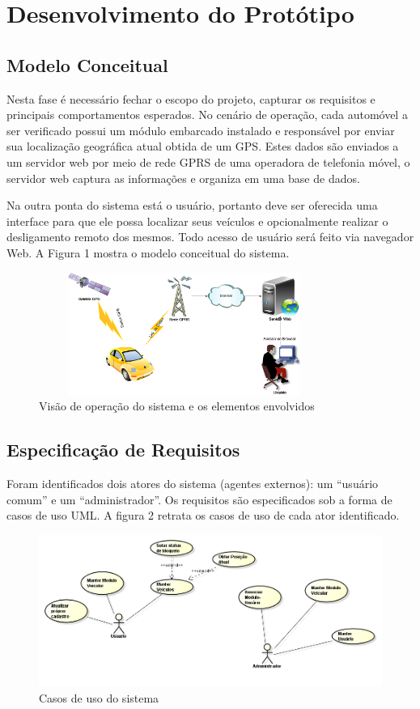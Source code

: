 \chapter{Desenvolvimento do Protótipo}
\label{cap:desenvolvimento do prototipo}

\section{Modelo Conceitual}
Nesta fase é necessário fechar o escopo do projeto, capturar os requisitos e principais comportamentos 
esperados. No cenário de operação, cada automóvel a ser verificado possui um módulo embarcado instalado 
e responsável por enviar sua localização geográfica atual obtida de um GPS. Estes dados são enviados a 
um servidor web por meio de rede GPRS de uma operadora de telefonia móvel, o servidor web captura as 
informações e organiza em uma base de dados. 

Na outra ponta do sistema está o usuário, portanto deve ser oferecida uma interface para que ele possa
localizar seus veículos e opcionalmente realizar o desligamento remoto dos mesmos. Todo acesso de usuário 
será feito via navegador Web. A Figura 1 mostra o modelo conceitual do sistema.

\begin{figure}[!htb]
\centering
\includegraphics[width=9.5cm,height=4.0cm]{figures/1_conceitual.png}
\caption{Visão de operação do sistema e os elementos envolvidos}
\label{Figura 1}
\end{figure}

\section{Especificação de Requisitos}
Foram identificados dois atores do sistema (agentes externos): um “usuário comum” e um “administrador”. 
Os requisitos são especificados sob a forma de casos de uso UML. A figura 2 retrata os casos de uso de
cada ator identificado.

\begin{figure}[!htb]
\centering
\includegraphics[width=15.16cm]{figures/2_uc.png}
\caption{Casos de uso do sistema}
\label{Figura 2}
\end{figure}

